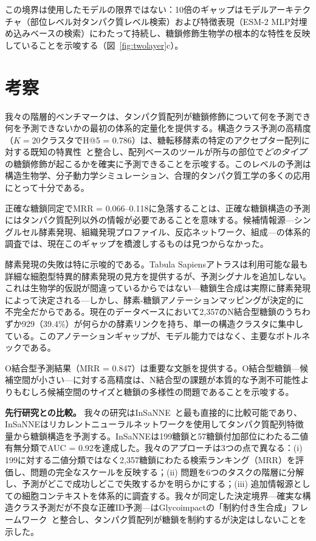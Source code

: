 \documentclass[11pt,a4paper]{ltjsarticle}
\begin{document}
この境界は使用したモデルの限界ではない：10倍のギャップはモデルアーキテクチャ（部位レベル対タンパク質レベル検索）および特徴表現（ESM-2 MLP対埋め込みベースの検索）にわたって持続し、糖鎖修飾生物学の根本的な特性を反映していることを示唆する（図~\ref{fig:twolayer}c）。

\section{考察}

我々の階層的ベンチマークは、タンパク質配列が糖鎖修飾について何を予測でき何を予測できないかの最初の体系的定量化を提供する。構造クラス予測の高精度（$K = 20$クラスタでH@5 = 0.786）は、糖転移酵素の特定のアクセプター配列に対する既知の特異性~\cite{schjoldager2020}と整合し、配列ベースのツールが所与の部位で\textit{どのタイプ}の糖鎖修飾が起こるかを確実に予測できることを示唆する。このレベルの予測は構造生物学、分子動力学シミュレーション、合理的タンパク質工学の多くの応用にとって十分である。

正確な糖鎖同定でMRR = 0.066--0.118に急落することは、正確な糖鎖構造の予測にはタンパク質配列以外の情報が必要であることを意味する。候補情報源---シングルセル酵素発現、組織発現プロファイル、反応ネットワーク、組成---の体系的調査では、現在このギャップを橋渡しするものは見つからなかった。

酵素発現の失敗は特に示唆的である。Tabula Sapiensアトラスは利用可能な最も詳細な細胞型特異的酵素発現の見方を提供するが、予測シグナルを追加しない。これは生物学的仮説が間違っているからではない---糖鎖生合成は実際に酵素発現によって決定される---しかし、酵素-糖鎖アノテーションマッピングが決定的に不完全だからである。現在のデータベースにおいて2,357のN結合型糖鎖のうちわずか929（39.4\%）が何らかの酵素リンクを持ち、単一の構造クラスタに集中している。このアノテーションギャップが、モデル能力ではなく、主要なボトルネックである。

O結合型予測結果（MRR = 0.847）は重要な文脈を提供する。O結合型糖鎖---候補空間が小さい---に対する高精度は、N結合型の課題が本質的な予測不可能性よりもむしろ候補空間のサイズと糖鎖の多様性の問題であることを示唆する。

\textbf{先行研究との比較。}
我々の研究はInSaNNE~\cite{kellman2024}と最も直接的に比較可能であり、InSaNNEはリカレントニューラルネットワークを使用してタンパク質配列特徴量から糖鎖構造を予測する。InSaNNEは199糖鎖と57糖鎖付加部位にわたる二値有無分類でAUC = 0.92を達成した。我々のアプローチは3つの点で異なる：(i) 199に対する二値分類ではなく2,357糖鎖にわたる検索ランキング（MRR）を評価し、問題の完全なスケールを反映する；(ii) 問題を6つのタスクの階層に分解し、予測がどこで成功しどこで失敗するかを明らかにする；(iii) 追加情報源としての細胞コンテキストを体系的に調査する。我々が同定した決定境界---確実な構造クラス予測だが不良な正確ID予測---はGlycoimpactの「制約付き生合成」フレームワーク~\cite{glycoimpact2024}と整合し、タンパク質配列が糖鎖を制約するが決定はしないことを示した。
\end{document}
